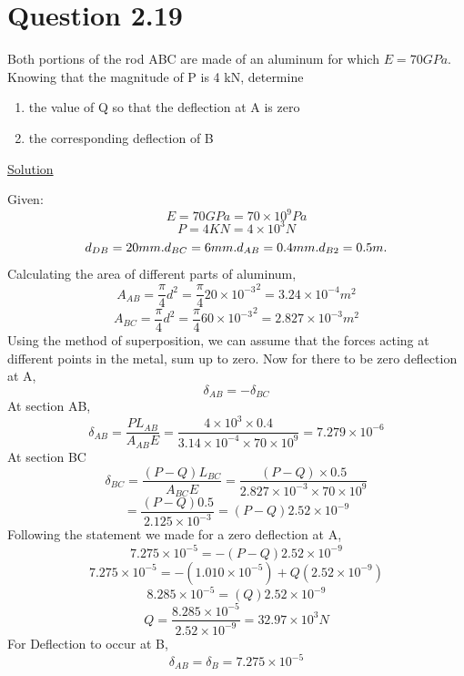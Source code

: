 \documentclass{article}
\begin{document}
\section*{Question 2.19}
Both portions of the rod ABC are made of an aluminum for which $E = 70 GPa$. Knowing that the magnitude of P is 4 kN, determine
\begin{enumerate}
\item  the value of Q so that the deflection at A is zero
\item  the corresponding deflection of B
\end{enumerate}
\begin{center}\underline{ Solution}\end{center}
Given: 
\[E = 70GPa = 70 \times 10^{9}Pa\]
\[P = 4KN = 4 \times 10^{3}N\]
\[d_{DB} = 20mm. \space \space d_{BC} = 6mm. \space \space d_{AB} = 0.4mm. \space \space d_{B2} = 0.5m. \space \space\]
Calculating the area of different parts of aluminum,
\[A_{AB} = \frac{\pi}{4}d^{2} = \frac{\pi}{4}{20\times 10^{-3}}^2 = 3.24  \times 10^{-4}m^{2}\]
\[A_{BC} = \frac{\pi}{4}d^{2} = \frac{\pi}{4}{60\times 10^{-3}}^2 = 2.827  \times 10^{-3}m^{2}\]
Using the method of superposition, we can assume that the forces acting at different points in the metal, sum up to zero.
\newline
Now for there to be zero deflection at A, 
\[\delta_{AB} = -\delta_{BC}\]
At section AB, 
\[\delta_{AB} = \frac{PL_{AB}}{A_{AB}E} = \frac{4\times 10^{3} \times 0.4}{3.14 \times 10^{-4} \times 70 \times 10^{9}}= 7.279\times10^{-6} \]
At section BC
\[\delta_{BC} = \frac{(P-Q)L_{BC}}{A_{BC}E} = \frac{(P-Q) \times 0.5}{2.827 \times 10^{-3} \times 70 \times 10^{9}}\]
\[=\frac{(P-Q)0.5}{2.125 \times 10^{-3}} = {(P-Q)2.52\times10^{-9}}\]
Following the statement we made for a zero deflection at A,
\[7.275\times10^{-5} =- (P-Q)2.52\times10^{-9}\]
\[7.275\times10^{-5} = -(1.010\times10^{-5})+ Q(2.52\times10^{-9})\]
\[8.285\times10^{-5} = (Q)2.52\times10^{-9}\]
\[Q = \frac{8.285\times10^{-5}}{2.52\times10^{-9}} = 32.97\times10^{3}N\]
For Deflection to occur at B,
\[\delta_{AB} = \delta_{B} = 7.275\times10^{-5}\]
\end{document}

